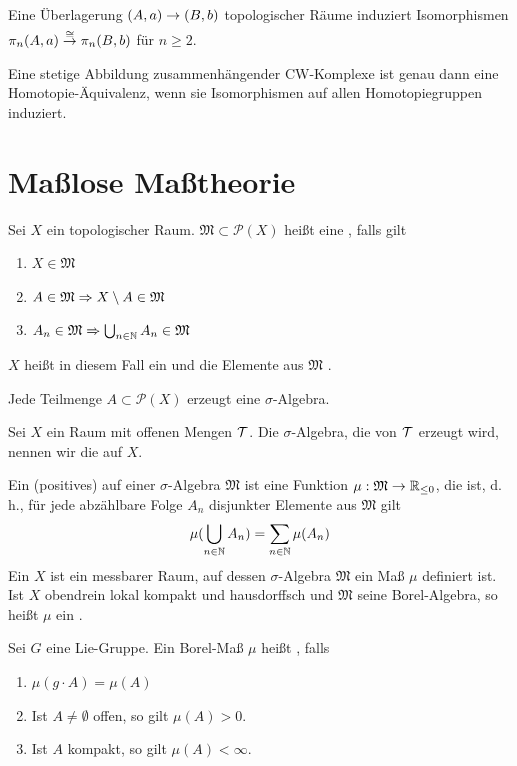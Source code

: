 \documentclass{book}
\renewcommand{\M}{\mathfrak{M}}
\renewcommand{\P}{\mathcal{P}}
\begin{document}
\Prop{}
Eine Überlagerung $(A,a) \overset{}{\rightarrow} (B,b)$ topologischer Räume induziert Isomorphismen $\pi_n(A,a) \overset{\overset{}{\cong}}{\rightarrow} \pi_n(B,b)$ für $n\geq 2$.

Eine stetige Abbildung zusammenhängender CW-Komplexe ist genau dann eine Homotopie-Äquivalenz, wenn sie Isomorphismen auf allen Homotopiegruppen induziert.


\section{Maßlose Maßtheorie}

\Def{}
Sei $X$ ein topologischer Raum. $\M \subset \P(X)$ heißt eine , falls gilt
\begin{enumerate}
	\item $X \in \M$
	\item $A \in \M \impl{} X\setminus A \in \M$
	\item $A_n \in \M \impl{} \bigcup_{n\in \N}A_n \in \M$
\end{enumerate}
$X$ heißt in diesem Fall ein  und die Elemente aus $\M$ .

\Satz{}
Jede Teilmenge $A \subset \P(X)$ erzeugt eine $\sigma$-Algebra.

\Def{}
Sei $X$ ein Raum mit offenen Mengen $\mathcal{T}$. Die $\sigma$-Algebra, die von $\mathcal{T}$ erzeugt wird, nennen wir die  auf $X$.

\Def{}
Ein (positives)  auf einer $\sigma$-Algebra $\M$ ist eine Funktion $\mu : \M \pfeil{} \R_{\leq 0}$, die  ist, d.\,h., für jede abzählbare Folge $A_n$ disjunkter Elemente aus $\M$ gilt
\[ \mu(\bigcup_{n\in \mathbb{N}}A_n) = \sum_{n\in \mathbb{N}}\mu(A_n) \]
Ein  $X$ ist ein messbarer Raum, auf dessen $\sigma$-Algebra $\M$ ein Maß $\mu$ definiert ist.\\
Ist $X$ obendrein lokal kompakt und hausdorffsch und $\M$ seine Borel-Algebra, so heißt $\mu$ ein .

\Def{}
Sei $G$ eine Lie-Gruppe. Ein Borel-Maß $\mu$ heißt  , falls
\begin{enumerate}
	\item $\mu(g\cdot A) = \mu(A)$
	\item Ist $A\neq\emptyset$ offen, so gilt $\mu(A) > 0$.
	\item Ist $A$ kompakt, so gilt $\mu(A) < \infty$.
\end{enumerate}
\end{document}
